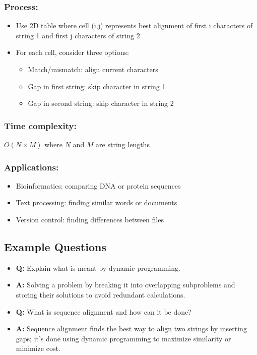 \documentclass[11pt,a4paper]{article}
\begin{document}
\begin{multicols}{2}
\subsubsection{Process:}
\begin{itemize}
    \item Use 2D table where cell (i,j) represents best alignment of first i characters of string 1 and first j characters of string 2
    \item For each cell, consider three options:
    \begin{itemize}
        \item Match/mismatch: align current characters
        \item Gap in first string: skip character in string 1
        \item Gap in second string: skip character in string 2
    \end{itemize}
\end{itemize}
\subsubsection{Time complexity:}
$O(N \times M)$ where $N$ and $M$ are string lengths
\subsubsection{Applications:}
\begin{itemize}
    \item Bioinformatics: comparing DNA or protein sequences
    \item Text processing: finding similar words or documents
    \item Version control: finding differences between files
\end{itemize}

\subsection{Example Questions}
\begin{itemize}
    \item \textbf{Q:} Explain what is meant by dynamic programming.
    \item \textbf{A:} Solving a problem by breaking it into overlapping subproblems and storing their solutions to avoid redundant calculations.

    \item \textbf{Q:} What is sequence alignment and how can it be done?
    \item \textbf{A:} Sequence alignment finds the best way to align two strings by inserting gaps; it's done using dynamic programming to maximize similarity or minimize cost.


\end{itemize}
\end{multicols}
\end{document}
